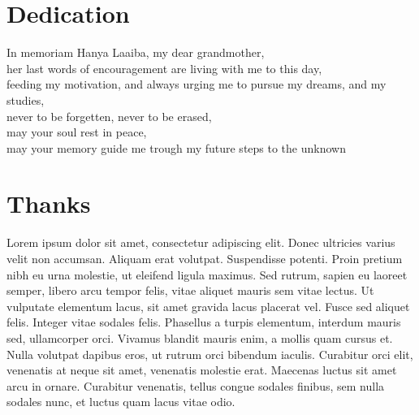 
\chapter*{Dedication}
\thispagestyle{empty}
%
\begin{center}
  In memoriam Hanya Laaiba, my dear grandmother, ~ \\
  her last words of encouragement are living with me to this day, ~ \\
  feeding my motivation, and always urging me to pursue my dreams, and my studies, ~\\
  never to be forgetten, never to be erased, ~ \\
  may your soul rest in peace, ~ \\
  may your memory guide me trough my future steps to the unknown ~ \\


\end{center}
%
%
%
%
%
%
%
\cleardoublepage%
\chapter*{Thanks}
\thispagestyle{empty}
%
Lorem ipsum dolor sit amet, consectetur adipiscing elit. Donec ultricies varius velit non accumsan. Aliquam erat volutpat. Suspendisse potenti. Proin pretium nibh eu urna molestie, ut eleifend ligula maximus. Sed rutrum, sapien eu laoreet semper, libero arcu tempor felis, vitae aliquet mauris sem vitae lectus. Ut vulputate elementum lacus, sit amet gravida lacus placerat vel. Fusce sed aliquet felis. Integer vitae sodales felis. Phasellus a turpis elementum, interdum mauris sed, ullamcorper orci. Vivamus blandit mauris enim, a mollis quam cursus et. Nulla volutpat dapibus eros, ut rutrum orci bibendum iaculis. Curabitur orci elit, venenatis at neque sit amet, venenatis molestie erat. Maecenas luctus sit amet arcu in ornare. Curabitur venenatis, tellus congue sodales finibus, sem nulla sodales nunc, et luctus quam lacus vitae odio.